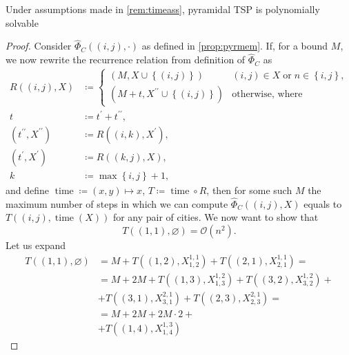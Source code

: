\documentclass[index=totoc,bibliography=totoc]{scrartcl}
\newcommand{\annotation}[1]{\marginpar{\small\itshape\color{green}#1}}
\numberwithin{equation}{section}
\numberwithin{figure}{section}
\numberwithin{table}{section}
\begin{document}
\begin{corollary}
\label{cor:pyrtime}
  Under assumptions made in \cref{rem:timeass},
  pyramidal TSP is polynomially solvable
\end{corollary}
\begin{proof}
  Consider $\widehat{\Phi}_C\left((i,j),\cdot\right)$ as defined in \cref{prop:pyrmem}.
  If, for a bound $M$,
  we now rewrite the recurrence relation from definition of $\widehat{\Phi}_C$ as
  \begin{align}
    \label{eq:pyrtime}
    R\left((i,j),X\right) & \coloneqq
    \begin{cases}
      \left(M,X \cup \left\{(i,j)\right\}\right) & (i,j) \in X \;\text{or}\; n \in \left\{i,j\right\},
      \\
      \left(M+t,X^{\prime\prime} \cup \left\{(i,j)\right\}\right) & \text{otherwise, where}
    \end{cases}
    \\
    t & \coloneqq t^{\prime} + t^{\prime\prime},
    \nonumber
    \\
    \left(t^{\prime\prime},X^{\prime\prime}\right) & \coloneqq R\left((i,k),X^\prime\right),
    \nonumber
    \\
    \left(t^{\prime},X^{\prime}\right) & \coloneqq R\left((k,j),X\right),
    \nonumber
    \\
    k & \coloneqq \max \left\{i,j\right\} + 1,
    \nonumber
  \end{align}
  and define $\operatorname{time} \coloneqq (x,y) \mapsto x$,
  $T \coloneqq \operatorname{time} \circ R$,
  then for some such $M$
  the maximum number of steps in which we can compute
  $\widehat{\Phi}_C\left((i,j),X\right)$
  equals to
  $T\left((i,j),\operatorname{time}\left(X\right)\right)$
  for any pair of cities.
  We now want to show that
  \[
    T\left((1,1),\varnothing\right) = \mathcal{O}\left(n^2\right).
  \]
  \annotation{alignment}
  Let us expand
  \begin{align*}
    T\left((1,1),\varnothing\right) & =
    M + T\left((1,2),X_{1,2}^{1,1}\right)
      + T\left((2,1),X_{2,1}^{1,1}\right) =
    \\ & = M + 2M + T\left((1,3),X_{1,3}^{1,2}\right)
                  + T\left((3,2),X_{3,2}^{1,2}\right) +
             \\ & + T\left((3,1),X_{3,1}^{2,1}\right)
                  + T\left((2,3),X_{2,3}^{2,1}\right) =
    \\ & = M + 2M + 2M\cdot 2 +
    \\ & + T\left((1,4),X_{1,4}^{1,3}\right)

\end{align*}
\end{proof}
\end{document}
